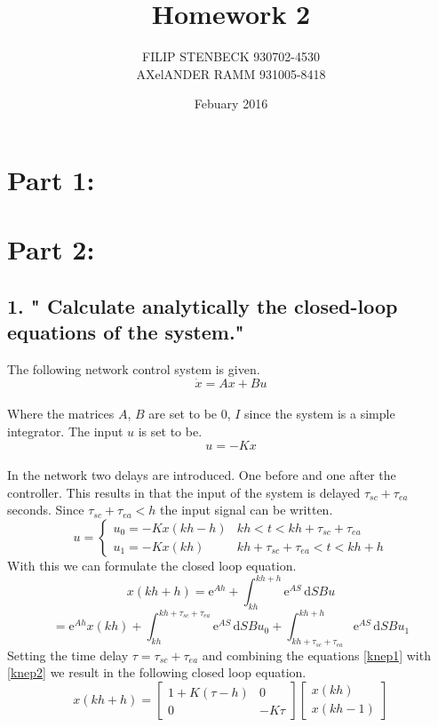 \documentclass[10pt,a4paper]{article}
\author{FILIP STENBECK	930702-4530 \\ AXelANDER RAMM 931005-8418}
\date{Febuary 2016}
\title{Homework 2}
\begin{document}
\maketitle
\clearpage
\section*{Part 1:}
\section*{Part 2:}
\subsection*{1. " Calculate analytically the closed-loop equations of the system."}
The following network control system is given. 
\begin{equation}
\dot{x}=Ax+Bu
\end{equation}\\ Where the matrices $A$, $B$ are set to be $0$, $I$ since the system is a simple integrator. The input $u$ is set to be. \\
\begin{equation*}
u=-Kx
\end{equation*}\\
In the network two delays are introduced. One before and one after the controller. This results in that the input of the system is delayed $\tau_{sc}+\tau_{ea}$ seconds. Since $\tau_{sc}+\tau_{ea}<h$ the input signal can be written.\\
\begin{equation}\label{knep1}
u=
\begin{cases}
u_0=-Kx(kh-h)&kh<t<kh+\tau_{sc}+\tau_{ea}\\
u_1=-Kx(kh)&kh+\tau_{sc}+\tau_{ea}<t<kh+h
\end{cases}
\end{equation}
With this we can formulate the closed loop equation.
\begin{equation*}
x(kh+h)=\mathrm{e}^{Ah}+\int_{kh}^{kh+h} \mathrm{e}^{AS}\,\mathrm{d}S Bu
\end{equation*}
\begin{equation}\label{knep2}
=\mathrm{e}^{Ah}x(kh)+\int_{kh}^{kh+\tau_{sc}+\tau_{ea}} \mathrm{e}^{AS}\,\mathrm{d}S Bu_0+\int_{kh+\tau_{sc}+\tau_{ea}}^{kh+h} \mathrm{e}^{AS}\,\mathrm{d}S Bu_1
\end{equation}
Setting the time delay $\tau=\tau_{sc}+\tau_{ea}$ and combining the equations \ref{knep1} with \ref{knep2} we result in the following closed loop equation.
\begin{equation*}
x(kh+h)=\begin{bmatrix}
1+K(\tau-h)&0\\
0&-K\tau
\end{bmatrix}
\begin{bmatrix}
x(kh)\\
x(kh-1)
\end{bmatrix}
\end{equation*}
\end{document}

